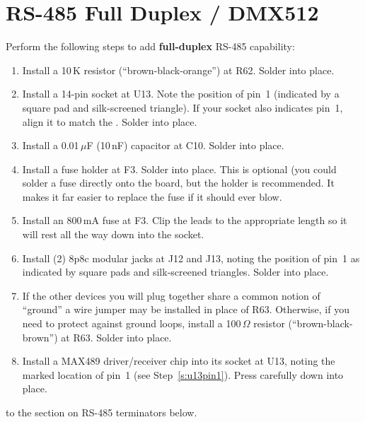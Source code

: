 \documentclass[letterpaper,twoside,onecolumn,openright,final]{memoir}
\begin{document}
\section{RS-485 Full Duplex / DMX512}
Perform the following steps to add {\bfseries full-duplex} RS-485 capability:
\begin{enumerate}
\item	Install a 10\,K resistor (``brown-black-orange'') at R62.  Solder into place.
\item\label{s:u13pin1}
	Install a 14-pin  socket at U13.  Note the position of pin~1 (indicated
	by a square pad and silk-screened triangle).  If your socket also indicates pin~1, align
	it to match the . Solder into place.
\item	Install a 0.01\,$\mu$F (10\,nF) capacitor at C10. Solder into place.
\item	Install a fuse holder at F3.  Solder into place.  This is optional (you could solder a fuse
	directly onto the board, but the holder is recommended.  It makes it far easier to replace
	the fuse if it should ever blow.
\item	Install an 800\,mA fuse at F3.  Clip the leads to the appropriate length so it will rest
	all the way down into the socket.
\item	Install (2) 8p8c modular jacks at J12 and J13, noting the position of pin~1 as indicated by
	square pads and silk-screened triangles.  Solder into place.
\item	If the other devices you will plug together share a common notion of ``ground'' a wire jumper
	may be installed in place of R63.  Otherwise, if you need to protect against ground loops,
	install a 100\,$\Omega$ resistor (``brown-black-brown'') at R63. Solder into place.
\item	Install a MAX489 driver/receiver chip into its socket at U13, noting the marked location
	of pin~1 (see Step~\ref{s:u13pin1}).  Press carefully down into place.
\end{enumerate}

\bigskip{} to the section on RS-485 terminators below.
\end{document}
